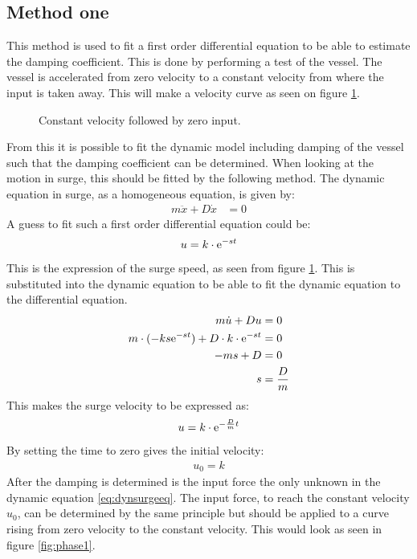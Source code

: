 \subsection{Method one}
\label{subsec:methodone}
This method is used to fit a first order differential equation to be able to estimate the damping coefficient. This is done by performing a test of the vessel. The vessel is accelerated from zero velocity to a constant velocity from where the input is taken away. This will make a velocity curve as seen on figure \ref{fig:phase3}.
\begin{figure}[htbp]
	\centering
	
	\caption{Constant velocity followed by zero input.}
	\label{fig:phase3}
\end{figure}
From this it is possible to fit the dynamic model including damping of the vessel such that the damping coefficient can be determined. When looking at the motion in surge, this should be fitted by the following method. The dynamic equation in surge, as a homogeneous equation, is given by:
\begin{align}
m \ddot x + D \dot x &= 0
\label{eq:dynsurgeeq}
\end{align}
A guess to fit such a first order differential equation could be:
\begin{align}
u = k \cdot \mathrm{e}^{-st}
\end{align}
This is the expression of the surge speed, as seen from figure \ref{fig:phase3}. This is substituted into the dynamic equation to be able to fit the dynamic equation to the differential equation.
\begin{align}
m \dot u + Du &= 0\\
m \cdot (-ks\mathrm{e}^{-st}) + D \cdot k \cdot \mathrm{e}^{-st} &= 0\\
-ms+D&=0\\
s&=\frac{D}{m}
\end{align}
This makes the surge velocity to be expressed as:
\begin{align}
u = k \cdot \mathrm{e}^{-\frac{D}{m}t}
\end{align}
By setting the time to zero gives the initial velocity:
\begin{align}
u_0 = k
\end{align}
After the damping is determined is the input force the only unknown in the dynamic equation \eqref{eq:dynsurgeeq}. The input force, to reach the constant velocity $u_0$, can be determined by the same principle but should be applied to a curve rising from zero velocity to the constant velocity. This would look as seen in figure \ref{fig:phase1}.
